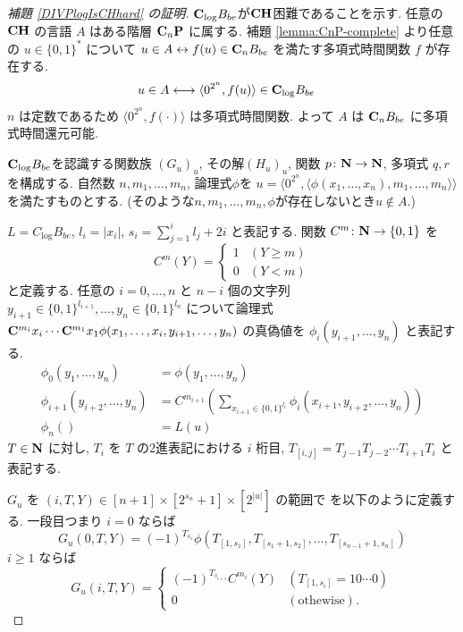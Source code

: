 \begin{proof}[\rm 補題 \ref{DIVPlogIsCHhard} の証明]
 $\mathbf{C}_{\log} B_{be}$が$\mathbf{CH}$困難であることを示す.
 任意の $\mathbf{CH}$ の言語 $A$ はある階層 $\mathbf{C}_n \mathbf{P}$ に属する. 
 補題 \ref{lemma:CnP-complete} より任意の $u \in \{0,1\}^*$ について
 $u \in A \leftrightarrow f(u) \in \mathbf{C}_n B_{be}$ 
 を満たす多項式時間関数 $f$ が存在する.
 \begin{align}
  u \in A 
  & \longleftrightarrow \langle 0^{2^n}, f(u) \rangle \in \mathbf{C}_{\log} B_{be}
 \end{align}
 $n$ は定数であるため $\langle 0^{2^n}, f(\cdot) \rangle$ は多項式時間関数.
 よって $A$ は $\mathbf{C}_n B_{be}$ に多項式時間還元可能.


 $\mathbf{C}_{\log} B_{be}$を認識する関数族 $(G_u)_u$, 
 その解$(H_u)_u$, 関数 $p \colon \mathbf N \to \mathbf N$, 多項式 $q,r$ を構成する.
 自然数 $n, m_1, \dots, m_n$, 論理式$\phi$を
 $u  = \langle 0^{2^n}, 
 \langle \phi(x_1, \dots, x_n), m_1, \dots, m_n \rangle \rangle$
 を満たすものとする. 
 (そのような$n, m_1, \dots, m_n, \phi$が存在しないとき$u \not \in A$.)
 
 
 $L = C_{\log} B_{be}$,
 $l_i = |x_i|$,
 $s_i = \sum^i_{j=1}l_j + 2i$  と表記する.
 関数 $C^m \colon \mathbf N \to \{0,1\}$ を
 \begin{equation}
  C^m(Y) 
     = \begin{cases}
       1 & (Y \ge m) \\
       0 & (Y < m) \end{cases}
 \end{equation}
 と定義する. 
 任意の $i = 0, \dots, n$ と $n-i$ 個の文字列 
 $y_{i+1} \in \{0,1\}^{l_{i+1}}, \dots, y_n \in \{0,1\}^{l_n}$ 
 について論理式
 $\mathbf{C}^{m_{i}}{x_i} \cdots \mathbf{C}^{m_1}{x_1}
 \phi(x_1, \dots, x_i, y_{i+1}, \dots, y_n)$
 の真偽値を $\phi_i(y_{i+1}, \dots, y_n)$ と表記する.
 \begin{align}
  \phi_0 (y_1, \dots, y_n) &= \phi(y_1, \dots, y_n)
  \\ \label{eq:phi-step}
  \phi_{i+1}(y_{i+2}, \dots, y_n) 
  &= C^{m_{i+1}}\left(\sum\nolimits_{x_{i+1} \in \{0,1\}^{l_i}} 
  \phi_i(x_{i+1}, y_{i+2}, \dots, y_{n})\right) 
  \\
  \phi_n() &= L(u) 
 \end{align}
 $T \in \mathbf N$ に対し, $T_i$ を $T$ の2進表記における $i$ 桁目, 
 $T_{[i,j]} = T_{j-1} T_{j-2} \cdots T_{i+1} T_{i}$ と表記する.


 $G_u$ を $(i, T, Y) \in [n+1] \times [2^{s_n}+1] \times [2^{|u|}]$ の範囲で
 を以下のように定義する. 一段目つまり $i=0$ ならば
 \begin{equation}
  G_u(0,T,Y) = 
   (-1)^{T_{s_1}}\phi(T_{[1,s_1]}, T_{[s_1+1,s_2]},
    \dots, T_{[s_{n-1}+1,s_n]}) 
 \end{equation}
 $i \ge 1$ ならば
 \begin{equation} \label{eq:def-Gu:case0}
  G_u(i,T,Y) = 
   \begin{cases}
    (-1)^{T_{s_{i+1}}} C^{m_i}(Y) 
    & (T_{[1,s_i]} = 10 \cdots 0) \\
    0 & (\text{othewise}).
   \end{cases} 
 \end{equation}



\end{proof}

